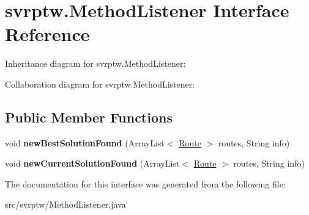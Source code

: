 \hypertarget{interfacesvrptw_1_1_method_listener}{}\section{svrptw.\+Method\+Listener Interface Reference}
\label{interfacesvrptw_1_1_method_listener}


Inheritance diagram for svrptw.\+Method\+Listener\+:


Collaboration diagram for svrptw.\+Method\+Listener\+:
\subsection*{Public Member Functions}
\begin{DoxyCompactItemize}
\item 
void {\bfseries new\+Best\+Solution\+Found} (Array\+List$<$ \hyperlink{classsvrptw_1_1_route}{Route} $>$ routes, String info)\hypertarget{interfacesvrptw_1_1_method_listener_aaa5c1fb917136fe60fd831abdefb2895}{}\label{interfacesvrptw_1_1_method_listener_aaa5c1fb917136fe60fd831abdefb2895}

\item 
void {\bfseries new\+Current\+Solution\+Found} (Array\+List$<$ \hyperlink{classsvrptw_1_1_route}{Route} $>$ routes, String info)\hypertarget{interfacesvrptw_1_1_method_listener_a75cefc55fed096bbc83e926429b3067e}{}\label{interfacesvrptw_1_1_method_listener_a75cefc55fed096bbc83e926429b3067e}

\end{DoxyCompactItemize}


The documentation for this interface was generated from the following file\+:\begin{DoxyCompactItemize}
\item 
src/svrptw/Method\+Listener.\+java\end{DoxyCompactItemize}
